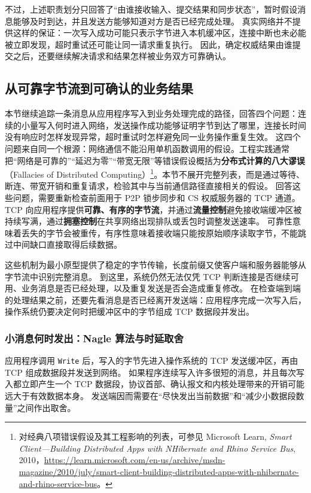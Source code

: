 不过，上述职责划分只回答了“由谁接收输入、提交结果和同步状态”，暂时假设消息能够及时到达，并且发送方能够知道对方是否已经完成处理。
真实网络并不提供这样的保证：一次写入成功可能只表示字节进入本机缓冲区，连接中断也未必能被立即发现，超时重试还可能让同一请求重复执行。
因此，确定权威结果由谁提交之后，还要继续解决请求和结果怎样被业务双方可靠确认。

\subsection{从可靠字节流到可确认的业务结果}\label{sec2:tcp-robustness}

本节继续追踪一条消息从应用程序写入到业务处理完成的路径，回答四个问题：连续的小量写入何时进入网络，发送操作成功能够证明字节到达了哪里，连接长时间没有响应时怎样发现异常，超时重试时怎样避免同一业务操作重复生效。
这四个问题来自同一个根源：网络通信不能沿用单机函数调用的假设。工程实践通常把“网络是可靠的”“延迟为零”“带宽无限”等错误假设概括为\textbf{分布式计算的八大谬误}（Fallacies of Distributed Computing）\footnote{对经典八项错误假设及其工程影响的列表，可参见 Microsoft Learn, \textit{Smart Client---Building Distributed Apps with NHibernate and Rhino Service Bus}, 2010，\url{https://learn.microsoft.com/en-us/archive/msdn-magazine/2010/july/smart-client-building-distributed-apps-with-nhibernate-and-rhino-service-bus}。}。本节不展开完整列表，而是通过等待、断连、带宽开销和重复请求，检验其中与当前通信路径直接相关的假设。
回答这些问题，需要重新检查前面用于 P2P 锁步同步和 CS 权威服务器的 TCP 通道。
TCP 向应用程序提供\textbf{可靠、有序的字节流}，并通过\textbf{流量控制}避免接收端缓冲区被持续写满，通过\textbf{拥塞控制}在共享网络出现排队或丢包时调整发送速率。
可靠性意味着丢失的字节会被重传，有序性意味着接收端只能按原始顺序读取字节，不能跳过中间缺口直接取得后续数据。

这些机制为最小原型提供了稳定的字节传输，长度前缀又使客户端和服务器能够从字节流中识别完整消息。
到这里，系统仍然无法仅凭 TCP 判断连接是否继续可用、业务消息是否已经处理，以及重复发送是否会造成重复修改。
在检查端到端的处理结果之前，还要先看消息是否已经离开发送端：应用程序完成一次写入后，操作系统仍要决定何时把缓冲区中的字节组成 TCP 数据段并发出。

\subsubsection{小消息何时发出：Nagle 算法与时延取舍}

应用程序调用 \texttt{Write} 后，写入的字节先进入操作系统的 TCP 发送缓冲区，再由 TCP 组成数据段并发送到网络。
如果程序连续写入许多很短的消息，并且每次写入都立即产生一个 TCP 数据段，协议首部、确认报文和内核处理带来的开销可能远大于有效数据本身。
发送端因而需要在“尽快发出当前数据”和“减少小数据段数量”之间作出取舍。

